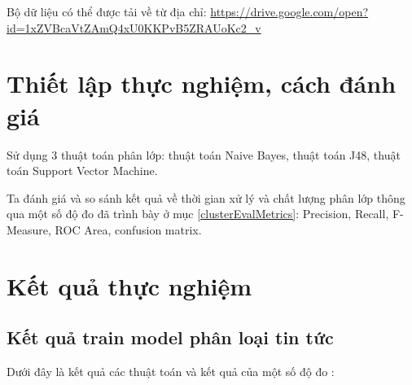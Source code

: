 Bộ dữ liệu có thể được tải về từ địa chỉ:
\url{https://drive.google.com/open?id=1xZVBcaVtZAmQ4xU0KKPvB5ZRAUoKc2_v}

\section{Thiết lập thực nghiệm, cách đánh giá}
Sử dụng 3 thuật toán phân lớp: thuật toán Naive Bayes, thuật toán J48, thuật toán Support Vector Machine. 

Ta đánh giá và so sánh kết quả về thời gian xử lý và chất lượng phân lớp thông qua một số độ đo đã trình bày ở mục \ref{clusterEvalMetrics}: Precision, Recall, F-Measure, ROC Area, confusion matrix.


\section{Kết quả thực nghiệm}

	\subsection{Kết quả train model phân loại tin tức}
	Dưới đây là kết quả các thuật toán và kết quả của một số độ đo :
